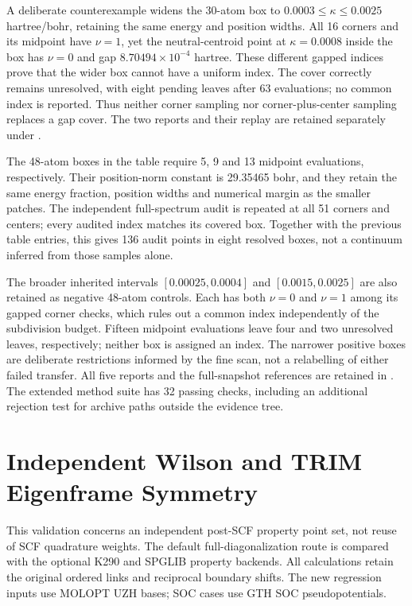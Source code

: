 \documentclass[11pt]{article}
\begin{document}
A deliberate counterexample widens the 30-atom box to
$0.0003\leq\kappa\leq0.0025$ hartree/bohr, retaining the same
energy and position widths. All 16 corners and its midpoint have
$\nu=1$, yet the neutral-centroid point at $\kappa=0.0008$
inside the box has $\nu=0$ and gap
$8.70494\times10^{-4}$ hartree. These different gapped indices
prove that the wider box cannot have a uniform index. The cover
correctly remains unresolved, with eight pending leaves after
63 evaluations; no common index is reported. Thus neither corner
sampling nor corner-plus-center sampling replaces a gap cover.
The two reports and their replay are retained separately under
.

The 48-atom boxes in the table require 5, 9 and 13 midpoint
evaluations, respectively. Their position-norm constant is
29.35465 bohr, and they retain the same energy fraction, position
widths and numerical margin as the smaller patches. The independent
full-spectrum audit is repeated at all 51 corners and centers;
every audited index matches its covered box. Together with the
previous table entries, this gives 136 audit points in eight
resolved boxes, not a continuum inferred from those samples alone.

\begingroup{}
The broader inherited intervals $[0.00025,0.0004]$ and
$[0.0015,0.0025]$ are also retained as negative 48-atom controls.
Each has both $\nu=0$ and $\nu=1$ among its gapped corner
checks, which rules out a common index independently of the
subdivision budget. Fifteen midpoint evaluations leave four and
two unresolved leaves, respectively; neither box is assigned an
index. The narrower positive boxes are deliberate restrictions
informed by the fine scan, not a relabelling of either failed
transfer. All five reports and the full-snapshot references are
retained in .
The extended method suite has 32 passing checks, including an
additional rejection test for archive paths outside the evidence tree.
\par\endgroup

\section{Independent Wilson and TRIM Eigenframe Symmetry}
\label{sec:si-property-symmetry}
This validation concerns an independent post-SCF property point set,
not reuse of SCF quadrature weights. The default full-diagonalization
route is compared with the optional K290 and SPGLIB property backends.
All calculations retain the original ordered links and reciprocal
boundary shifts. The new regression inputs use MOLOPT UZH bases;
SOC cases use GTH SOC pseudopotentials.
\end{document}

